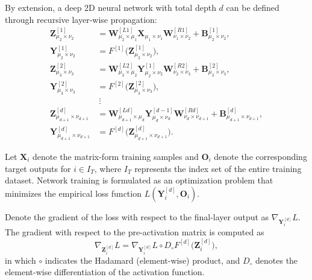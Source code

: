 \documentclass[pdflatex,sn-mathphys-num]{sn-jnl}%
\theoremstyle{thmstyleone}%
\theoremstyle{thmstyletwo}%
\theoremstyle{thmstylethree}%
\begin{document}
By extension, a deep 2D neural network with total depth $d$ can be defined through recursive layer-wise propagation:
\begin{equation}
\begin{split}
\boldsymbol{Z}^{[1]}_{\mu_2 \times \nu_2}
&=
\boldsymbol{W}^{[L1]}_{\mu_2 \times \mu_1}
\boldsymbol{X}_{\mu_1 \times \nu_1}
\boldsymbol{W}^{[R1]}_{\nu_1 \times \nu_2}
+ \boldsymbol{B}^{[1]}_{\mu_2 \times \nu_2},\\
\boldsymbol{Y}^{[1]}_{\mu_2 \times \nu_2}
&=
F^{[1]}\bigl(\boldsymbol{Z}^{[1]}_{\mu_2 \times \nu_2}\bigr),\\
\boldsymbol{Z}^{[2]}_{\mu_3 \times \nu_3}
&=
\boldsymbol{W}^{[L2]}_{\mu_3 \times \mu_2}
\boldsymbol{Y}^{[1]}_{\mu_2 \times \nu_2}
\boldsymbol{W}^{[R2]}_{\nu_2 \times \nu_3}
+ \boldsymbol{B}^{[2]}_{\mu_3 \times \nu_3},\\
\boldsymbol{Y}^{[2]}_{\mu_3 \times \nu_3}
&=
F^{[2]}\bigl(\boldsymbol{Z}^{[2]}_{\mu_3 \times \nu_3}\bigr),\\
&\ \vdots\\
\boldsymbol{Z}^{[d]}_{\mu_{d+1} \times \nu_{d+1}}
&=
\boldsymbol{W}^{[Ld]}_{\mu_{d+1} \times \mu_d}
\boldsymbol{Y}^{[d-1]}_{\mu_d \times \nu_d}
\boldsymbol{W}^{[Rd]}_{\nu_d \times \nu_{d+1}}
+ \boldsymbol{B}^{[d]}_{\mu_{d+1} \times \nu_{d+1}},\\
\boldsymbol{Y}^{[d]}_{\mu_{d+1} \times \nu_{d+1}}
&=
F^{[d]}\bigl(\boldsymbol{Z}^{[d]}_{\mu_{d+1} \times \nu_{d+1}}\bigr).
\end{split}
\end{equation}

Let $\boldsymbol{X}_i$ denote the matrix-form training samples and $\boldsymbol{O}_i$ denote the corresponding target outputs for $i\in I_T$, where $I_T$ represents the index set of the entire training dataset. Network training is formulated as an optimization problem that minimizes the empirical loss function $L(\boldsymbol{Y}^{[d]}_i,\boldsymbol{O}_i)$.

Denote the gradient of the loss with respect to the final-layer output as $\nabla_{\boldsymbol{Y}^{[d]}_i} L$. The gradient with respect to the pre-activation matrix is computed as
\begin{equation}
\nabla_{\boldsymbol{Z}^{[d]}_i} L
=
\nabla_{\boldsymbol{Y}^{[d]}_i} L
\circ
D_\circ\! F^{[d]}\bigl(\boldsymbol{Z}_i^{[d]}\bigr),
\end{equation}
in which $\circ$ indicates the Hadamard (element-wise) product, and $D_\circ$ denotes the element-wise differentiation of the activation function.
\end{document}

